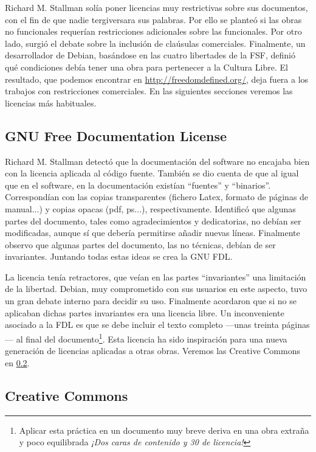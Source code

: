 Richard M. Stallman solía poner licencias muy restrictivas sobre sus
documentos, con el fin de que nadie tergiversara sus palabras. Por
ello se planteó si las obras no funcionales requerían restricciones
adicionales sobre las funcionales. Por otro lado, surgió el debate
sobre la inclusión de claúsulas comerciales. Finalmente, un
desarrollador de Debian, basándose en las cuatro libertades de la FSF,
definió qué condiciones debía tener una obra para pertenecer a la
Cultura Libre. El resultado, que podemos encontrar en
\url{http://freedomdefined.org/}, deja fuera a los trabajos con
restricciones comerciales. En las siguientes secciones veremos las
licencias más habituales.

\subsection{GNU Free Documentation License}

Richard M. Stallman detectó que la documentación del software no
encajaba bien con la licencia aplicada al código fuente. También se
dio cuenta de que al igual que en el software, en la documentación
existían ``fuentes'' y ``binarios''. Correspondían con las copias
transparentes (fichero Latex, formato de páginas de manual...) y
copias opacas (pdf, ps...), respectivamente. Identificó que algunas
partes del documento, tales como agradecimientos y dedicatorias, no
debían ser modificadas, aunque sí que debería permitirse añadir nuevas
líneas. Finalmente observo que algunas partes del documento, las no
técnicas, debían de ser invariantes. Juntando todas estas ideas se
crea la GNU FDL.

La licencia tenía retractores, que veían en las partes ``invariantes''
una limitación de la libertad. Debian, muy comprometido con sus
usuarios en este aspecto, tuvo un gran debate interno para decidir su
uso. Finalmente acordaron que si no se aplicaban dichas partes
invariantes era una licencia libre. Un inconveniente asociado a la FDL
es que se debe incluir el texto completo ---unas treinta páginas--- al
final del documento\footnote{Aplicar esta práctica en un documento muy
  breve deriva en una obra extraña y poco equilibrada \emph{¡Dos caras
    de contenido y 30 de licencia!}}. Esta licencia ha sido
inspiración para una nueva generación de licencias aplicadas a otras
obras. Veremos las Creative Commons en \ref{sub:creative}.

\subsection{Creative Commons}
\label{sub:creative}


